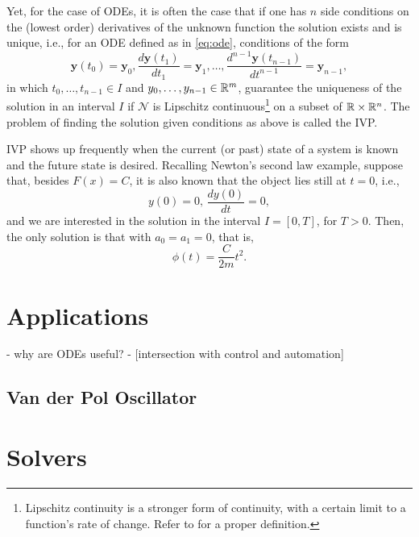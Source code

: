 Yet, for the case of ODEs, it is often the case that if one has $n$ side conditions on the (lowest order) derivatives of the unknown function the solution exists and is unique, i.e., for an ODE defined as in \eqref{eq:ode}, conditions of the form \[
\bm{y}\left( t_0 \right) =\bm{y}_0,\frac{d\bm{y}\left( t_1 \right) }{dt_1}=\bm{y}_1,\ldots,\frac{d^{n-1}\bm{y}\left( t_{n-1} \right) }{dt^{n-1}}= \bm{y}_{n-1}
,\] in which $t_0,\ldots,t_{n-1}\in I$ and $y_0,\ldots,y_{n-1}\in \mathbb{R}^m$, guarantee the uniqueness of the solution in an interval $I$ if $\mathcal{N}$ is Lipschitz continuous\footnote{Lipschitz continuity is a stronger form of continuity, with a certain limit to a function's rate of change. Refer to \textcite{sohrab_basic_2003} for a proper definition.} on a subset of $\mathbb{R}\times \mathbb{R}^{n}$\footnotemark. \cite{coddington_theory_2012}
The problem of finding the solution given conditions as above is called the \gls{IVP}.

\gls{IVP} shows up frequently when the current (or past) state of a system is known and the future state is desired. Recalling Newton's second law example, suppose that, besides $F(x)=C$, it is also known that the object lies still at $t=0$, i.e., \[
y(0) = 0,\,\frac{d y(0)}{dt}=0
,\] and we are interested in the solution in the interval $I=\left[ 0,T \right] $, for $T>0$. Then, the only solution is that with $a_0=a_1=0$, that is, \[
    \phi\left( t \right) = \frac{C}{2m}t^2
.\] 

\section{Applications}

- why are ODEs useful?
- [intersection with control and automation] 

\subsection{Van der Pol Oscillator}

\section{Solvers}

